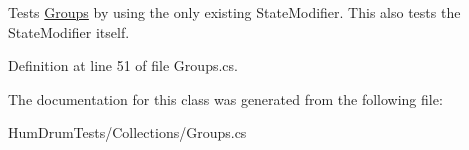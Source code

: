 Tests \hyperlink{classHumDrumTests_1_1Collections_1_1Groups}{Groups} by using the only existing State\+Modifier. This also tests the State\+Modifier itself. 



Definition at line 51 of file Groups.\+cs.



The documentation for this class was generated from the following file\+:\begin{DoxyCompactItemize}
\item 
Hum\+Drum\+Tests/\+Collections/Groups.\+cs\end{DoxyCompactItemize}
